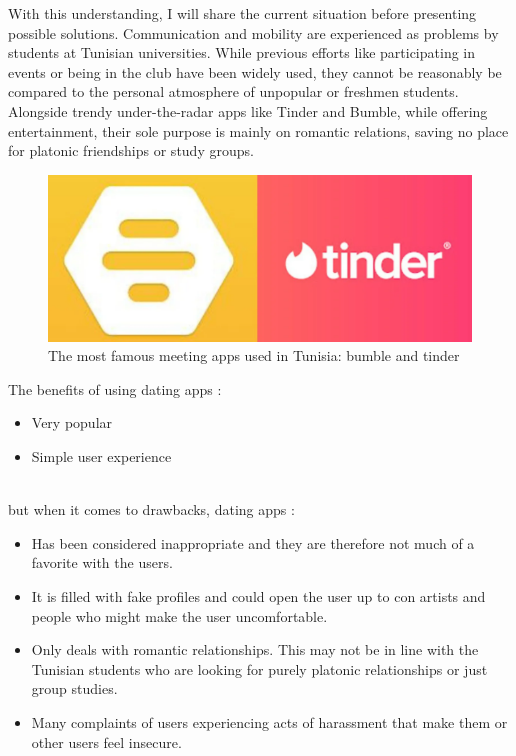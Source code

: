 With this understanding, I will share the current situation before presenting possible solutions. Communication and mobility are experienced as problems by students at Tunisian universities. While previous efforts like participating in events or being in the club have been widely used, they cannot be reasonably be compared to the personal atmosphere of unpopular or freshmen students. Alongside trendy under-the-radar apps like Tinder and Bumble, while offering entertainment, their sole purpose is mainly on romantic relations, saving no place for platonic friendships or study groups.
\\
\begin{figure}[H] 
            \centering
            \includegraphics[scale=0.5]{bumblextinder.png}
            \caption{The most famous meeting apps used in Tunisia: bumble and tinder} 
            \label{fig: meeting appslogos}
\end{figure}
The benefits of using dating apps :

\begin{itemize}
    \item Very popular
    \item Simple user experience
\end{itemize}
\\

but when it comes to drawbacks, dating apps :

\begin{itemize}
    \item Has been considered inappropriate and they are therefore not much of a favorite with the users.
    \item It is filled with fake profiles and could open the user up to con artists and people who might make the user uncomfortable.
    \item Only deals with romantic relationships. This may not be in line with the Tunisian students who are looking for purely platonic relationships or just group studies.
    \item Many complaints of users experiencing acts of harassment that make them or other users feel insecure.
\end{itemize}

